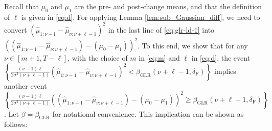 \documentclass[12pt]{interact}
\newcommand{\lp}{\left(}
\newcommand{\rp}{\right)}
\newcommand{\lb}{\left[}
\newcommand{\rb}{\right]}
\newcommand{\lbp}{\left\{}
\newcommand{\rbp}{\right\}}
\newcommand{\mrm}{\mathrm}
\theoremstyle{plain}
\begin{document}
Recall that $\mu_{0}$ and $\mu_{1}$ are the pre- and post-change means, and that the definition of $\ell$ is given in \eqref{eq:d}. For applying Lemma \ref{lem:sub_Gaussian_diff}, we need to convert $\lp\hat{\mu}_{1:\nu-1}-\hat{\mu}_{\nu:\nu+\ell-1}\rp^{2}$ in the last line of \eqref{eq:glr-ld-1} into $\lp\lp\hat{\mu}_{1:\nu-1}-\hat{\mu}_{\nu:\nu+\ell-1}\rp-\lp\mu_{0}-\mu_{1}\rp\rp^{2}$. To this end, we show that for any $\nu\in\lb m+1,T-\ell\rb$, with the choice of $m$ in \eqref{eq:m} and $\ell$ in \eqref{eq:d}, the event  $\lbp\frac{\lp\nu-1\rp \ell}{2\sigma^{2}\lp\nu+\ell-1\rp}\lp\hat{\mu}_{1:\nu-1}-\hat{\mu}_{\nu:\nu+\ell-1}\rp^{2}<\beta_{\mrm{GLR}}\lp\nu+\ell-1,\delta_{\mrm{F}}\rp\rbp$ implies another event $\lbp\frac{\lp\nu-1\rp \ell}{2\sigma^{2}\lp\nu+\ell-1\rp}\lp\lp\hat{\mu}_{1:\nu-1}-\hat{\mu}_{\nu:\nu+\ell-1}\rp-\lp\mu_{0}-\mu_{1}\rp\rp^{2}\geq\beta_{\mrm{GLR}}\lp\nu+\ell-1,\delta_{\mrm{F}}\rp\rbp$. Let $\beta = \beta_{\mrm{GLR}}$ for notational convenience. This implication can be shown as follows:
%
\end{document}
